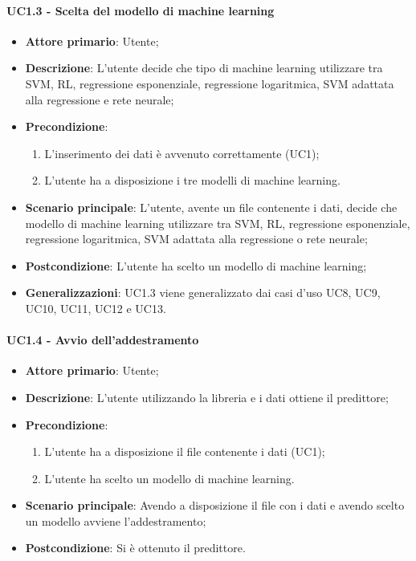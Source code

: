 \paragraph{UC1.3 - Scelta del modello di machine learning}%
\label{para:uc1.3}
\begin{itemize}
  \item \textbf{Attore primario}: Utente;
  \item \textbf{Descrizione}: L'utente decide che tipo di machine learning utilizzare tra SVM, RL, regressione esponenziale, regressione logaritmica, SVM adattata alla regressione e rete neurale;
  \item \textbf{Precondizione}:
  \begin{enumerate}
    \item L'inserimento dei dati è avvenuto correttamente (UC1);
    \item L'utente ha a disposizione i tre modelli di machine learning.
  \end{enumerate}
  \item \textbf{Scenario principale}: L'utente, avente un file contenente i dati, decide che modello di machine learning utilizzare tra SVM, RL, regressione esponenziale, regressione logaritmica, SVM adattata alla regressione o rete neurale;
  \item \textbf{Postcondizione}: L'utente ha scelto un modello di machine learning;
  \item \textbf{Generalizzazioni}: UC1.3 viene generalizzato dai casi d'uso  UC8, UC9, UC10, UC11, UC12 e UC13.
\end{itemize}

\paragraph{UC1.4 - Avvio dell'addestramento}
\label{para:uc1.4}
\begin{itemize}
  \item \textbf{Attore primario}: Utente;
  \item \textbf{Descrizione}: L'utente utilizzando la libreria e i dati ottiene il predittore;
  \item \textbf{Precondizione}:
  \begin{enumerate}
    \item L'utente ha a disposizione il file contenente i dati (UC1);
    \item L'utente ha scelto un modello di machine learning.
  \end{enumerate}
  \item \textbf{Scenario principale}: Avendo a disposizione il file con i dati e avendo scelto un modello avviene l'addestramento;
  \item \textbf{Postcondizione}: Si è ottenuto il predittore.
\end{itemize}

